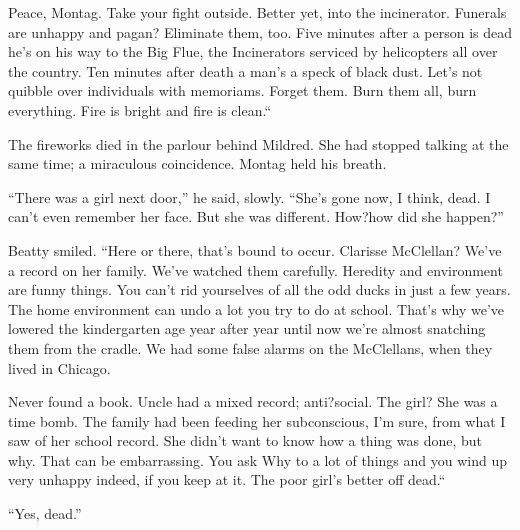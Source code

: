 \documentclass[11pt,openany]{book}
\begin{document}
Peace, Montag. Take your fight outside. Better yet, into the incinerator. Funerals are unhappy and pagan? Eliminate them, too. Five minutes after a person is dead he's on his way to the Big Flue, the Incinerators serviced by helicopters all over the country. Ten minutes after death a man's a speck of black dust. Let's not quibble over individuals with memoriams. Forget them. Burn them all, burn everything. Fire is bright and fire is clean.``

The fireworks died in the parlour behind Mildred. She had stopped talking at the same time; a miraculous coincidence. Montag held his breath.

``There was a girl next door,'' he said, slowly. ``She's gone now, I think, dead. I can't even remember her face. But she was different. How?how did she happen?''

Beatty smiled. ``Here or there, that's bound to occur. Clarisse McClellan? We've a record on her family. We've watched them carefully. Heredity and environment are funny things. You can't rid yourselves of all the odd ducks in just a few years. The home environment can undo a lot you try to do at school. That's why we've lowered the kindergarten age year after year until now we're almost snatching them from the cradle. We had some false alarms on the McClellans, when they lived in Chicago.

Never found a book. Uncle had a mixed record; anti?social. The girl? She was a time bomb. The family had been feeding her subconscious, I'm sure, from what I saw of her school record. She didn't want to know how a thing was done, but why. That can be embarrassing. You ask Why to a lot of things and you wind up very unhappy indeed, if you keep at it. The poor girl's better off dead.``

``Yes, dead.''
\end{document}
